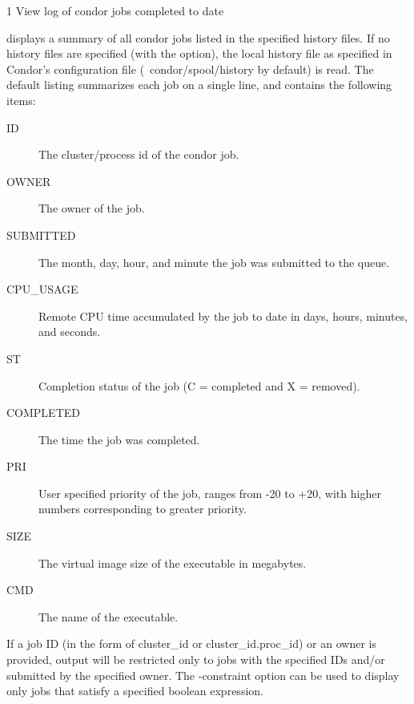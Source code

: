 \begin{ManPage}{\label{man-condor-history}}{1}
{View log of condor jobs completed to date}
\Synopsis {}
  

\Description
{} displays a summary of all condor jobs listed in the
specified history files.  If no history files are specified (with the  option), the local
history file as specified in Condor's configuration file
(~condor/spool/history by default) is read.  The default listing
summarizes each job on a single line, and  contains the following items:

\begin{description}
\item[ID] The cluster/process id of the condor job. 
\item[OWNER] The owner of the job. 
\item[SUBMITTED] The month, day, hour, and minute the job was submitted to the queue. 
\item[CPU\_USAGE] Remote CPU time accumulated by the job to date in days, hours, minutes, and seconds.
\item[ST] Completion status of the job (C = completed and X = removed).
\item[COMPLETED] The time the job was completed.
\item[PRI] User specified priority of the job, ranges from -20 to +20, with higher numbers corresponding to greater priority. 
\item[SIZE] The virtual image size of the executable in megabytes. 
\item[CMD] The name of the executable. 
\end{description}

If a job ID (in the form of cluster\_id or cluster\_id.proc\_id) or an owner is provided, 
output will be restricted only to jobs with the specified IDs and/or submitted by the specified owner.
The -constraint option can be used to display only jobs that satisfy a specified boolean expression.

\begin{Options}
\end{Options}

\end{ManPage}
